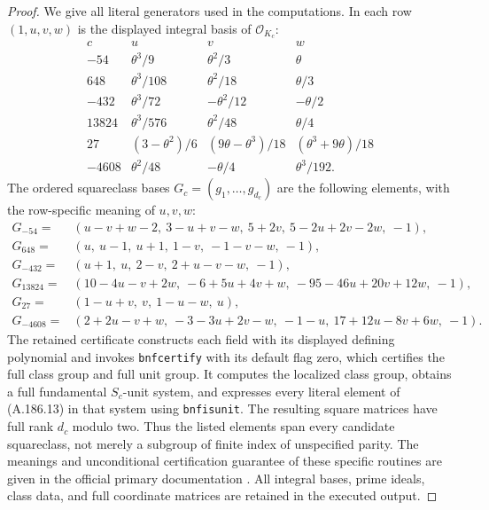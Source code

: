 \begin{proof}
We give all literal generators used in the computations.
In each row \((1,u,v,w)\) is the displayed integral basis
of \(\mathcal O_{K_c}\):
\[
\begin{array}{r|c|c|c}
c&u&v&w\\ \hline
-54&\theta^3/9&\theta^2/3&\theta\\
648&\theta^3/108&\theta^2/18&\theta/3\\
-432&\theta^3/72&-\theta^2/12&-\theta/2\\
13824&\theta^3/576&\theta^2/48&\theta/4\\
27&(3-\theta^2)/6&(9\theta-\theta^3)/18
                       &(\theta^3+9\theta)/18\\
-4608&\theta^2/48&-\theta/4&\theta^3/192.
\end{array}
\tag{A.186.12}
\]
The ordered squareclass bases \(G_c=(g_1,\ldots,g_{d_c})\)
are the following elements, with the row-specific meaning
of \(u,v,w\):
\[
\begin{aligned}
G_{-54}={}&(u-v+w-2,\ 3-u+v-w,\ 5+2v,\
                         5-2u+2v-2w,\ -1),\\
G_{648}={}&(u,\ u-1,\ u+1,\ 1-v,\ -1-v-w,\ -1),\\
G_{-432}={}&(u+1,\ u,\ 2-v,\ 2+u-v-w,\ -1),\\
G_{13824}={}&(10-4u-v+2w,\ -6+5u+4v+w,\
                         -95-46u+20v+12w,\ -1),\\
G_{27}={}&(1-u+v,\ v,\ 1-u-w,\ u),\\
G_{-4608}={}&(2+2u-v+w,\ -3-3u+2v-w,\ -1-u,\
                         17+12u-8v+6w,\ -1).
\end{aligned}
\tag{A.186.13}
\]
The retained certificate constructs each field with its
displayed defining polynomial and invokes
\texttt{bnfcertify} with its default flag zero, which
certifies the full class group and full unit group.
It computes the localized class group, obtains a full
fundamental \(S_c\)-unit system, and expresses every
literal element of (A.186.13) in that system using
\texttt{bnfisunit}.  The resulting square matrices have
full rank \(d_c\) modulo two.  Thus the listed elements
span every candidate squareclass, not merely a subgroup
of finite index of unspecified parity.  The meanings and
unconditional certification guarantee of these specific
routines are given in the official primary documentation
\cite[entries \texttt{bnfcertify}, \texttt{bnfsunit},
\texttt{bnfunits}, and \texttt{bnfisunit}]{LegPariNumberFields}.
All integral bases, prime ideals, class data, and full
coordinate matrices are retained in the executed output.


\end{proof}
